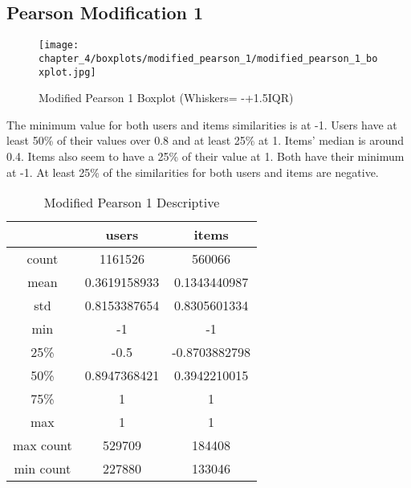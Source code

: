\subsection{Pearson Modification 1}

\begin{figure}[H]
\centering
\texttt{[image: chapter\_4/boxplots/modified\_pearson\_1/modified\_pearson\_1\_boxplot.jpg]}
\caption{Modified Pearson 1 Boxplot (Whiskers= -+1.5IQR)}
\label{figure:modified_pearson_1_boxplot}
\end{figure}

The minimum value for both users and items similarities is at -1. Users have at least 50\% of their
values over 0.8 and at least 25\% at 1. Items' median is around 0.4. Items also seem to have
a 25\% of their value at 1. Both have their minimum at -1. At least 25\% of the similarities
for both users and items are negative.

\begin{table}[H]
\centering
\caption{Modified Pearson 1 Descriptive}
\label{table:modified_pearson_1_descriptive}
\begin{tabular}{|c|c|c|}
\hline
          & \textbf{users} & \textbf{items} \\ \hline
count     & 1161526        & 560066         \\ \hline
mean      & 0.3619158933   & 0.1343440987   \\ \hline
std       & 0.8153387654   & 0.8305601334   \\ \hline
min       & -1             & -1             \\ \hline
25\%      & -0.5           & -0.8703882798  \\ \hline
50\%      & 0.8947368421   & 0.3942210015   \\ \hline
75\%      & 1              & 1              \\ \hline
max       & 1              & 1              \\ \hline
max count & 529709         & 184408         \\ \hline
min count & 227880         & 133046         \\ \hline
\end{tabular}
\end{table}

